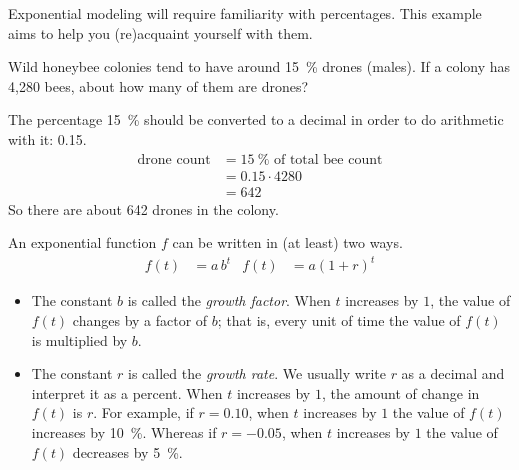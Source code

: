 \begin{doyouunderstand}
\begin{multicols}{2}
\begin{subproblem}
\begin{shortsolution}
\begin{itemize}
				\end{itemize}
			\end{shortsolution}
		\end{subproblem}
	\end{multicols}
\end{doyouunderstand}

Exponential modeling will require familiarity with percentages. This example aims to 
help you (re)acquaint yourself with them.

\begin{pccexample}
	Wild honeybee colonies tend to have around \SI{15}{\percent} drones (males).   If a colony has 4,280 bees, about how many of them are drones?
	\begin{pccsolution}
		The percentage \SI{15}{\percent} should be converted to a decimal in order to do arithmetic with it: 0.15.  
		\begin{align*}
			\textrm{drone count} & = \SI{15}{\percent}\textrm{ of total bee count} \\
			                     & =0.15\cdot4280                                  \\
			                     & = 642                                           
		\end{align*}
		So there are about 642 drones in the colony.
	\end{pccsolution}
\end{pccexample}

\begin{pccdefinition}\label{exp:def:growthfactorrate}
	An exponential function $f$ can be written in (at least) two ways.
	\begin{align*}
		f(t) & =a\,b^t & f(t) & =a(1+r)^t 
	\end{align*}
	\begin{itemize}
		\item The constant $b$ is called the \emph{growth factor}.  When $t$ increases by $1$, the value of $f(t)$ changes by a factor of $b$; that is, every unit of time the value of $f(t)$ is multiplied by $b$.
		\item The constant $r$ is called the \emph{growth rate}.  We usually write $r$ as a decimal and interpret it as a percent.  
		When $t$ increases by $1$, the amount of change in $f(t)$ is $r$. 
		For example, if $r=0.10$, when $t$ increases by $1$ the value of $f(t)$
		increases by \SI{10}{\percent}. Whereas if $r=-0.05$, when $t$ increases by $1$ 
		the value of $f(t)$ decreases by \SI{5}{\percent}.
	\end{itemize}
\end{pccdefinition}

